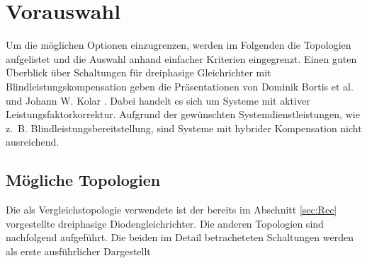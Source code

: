 \chapter{Vorauswahl}
Um die möglichen Optionen einzugrenzen, werden im Folgenden die Topologien aufgelistet und die Auswahl anhand einfacher Kriterien eingegrenzt. Einen guten Überblick über Schaltungen für dreiphasige Gleichrichter mit Blindleistungskompensation geben die Präsentationen von Dominik Bortis et al. \cite{Advanced3PhPFC} und Johann W. Kolar \cite{Essenceof3pKolar}. Dabei handelt es sich um Systeme mit aktiver Leistungsfaktorkorrektur. Aufgrund der gewünschten Systemdienstleistungen, wie z.~B. Blindleistungsbereitstellung, sind Systeme mit hybrider Kompensation nicht ausreichend.

\section{Mögliche Topologien}
Die als Vergleichstopologie verwendete ist der bereits im Abschnitt \ref{sec:Rec} vorgestellte dreiphasige Diodengleichrichter. Die anderen Topologien sind nachfolgend aufgeführt. Die beiden im Detail betracheteten Schaltungen werden als erste ausführlicher Dargestellt
